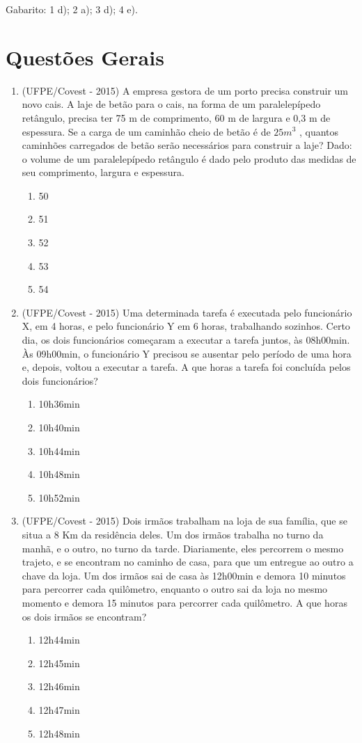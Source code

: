 Gabarito: 1 d); 2 a); 3 d); 4 e).

\section{Questões Gerais}

\begin{enumerate}
 \item (UFPE/Covest - 2015) A empresa gestora de um porto precisa construir um novo cais. A laje de betão para o cais, na forma de um paralelepípedo retângulo, precisa ter 75 m de comprimento, 60 m de largura e 0,3 m de espessura. Se a carga de um caminhão cheio de betão é de $25 m^3$ , quantos caminhões carregados de betão serão necessários para construir a laje? Dado: o volume de um paralelepípedo retângulo é dado pelo produto das medidas de seu comprimento, largura e espessura.
 \begin{enumerate}
 \item 50
 \item 51
 \item 52
 \item 53
 \item 54
\end{enumerate}

 \item (UFPE/Covest - 2015) Uma determinada tarefa é executada pelo funcionário X, em 4 horas, e pelo funcionário Y em 6 horas, trabalhando sozinhos. Certo dia, os dois funcionários começaram a executar a tarefa juntos, às 08h00min. Às 09h00min, o funcionário Y precisou se ausentar pelo período de uma hora e, depois, voltou a executar a tarefa. A que horas a tarefa foi concluída pelos dois funcionários?
 \begin{enumerate}
 \item 10h36min
 \item 10h40min
 \item 10h44min
 \item 10h48min
 \item 10h52min
\end{enumerate}

 \item (UFPE/Covest - 2015) Dois irmãos trabalham na loja de sua família, que se situa a 8 Km da residência deles. Um dos irmãos trabalha no turno da manhã, e o outro, no turno da tarde. Diariamente, eles percorrem o mesmo trajeto, e se encontram no caminho de casa, para que um entregue ao outro a chave da loja. Um dos irmãos sai de casa às 12h00min e demora 10 minutos para percorrer cada quilômetro, enquanto o outro sai da loja no mesmo momento e demora 15 minutos para percorrer cada quilômetro. A que horas os dois irmãos se encontram?
 \begin{enumerate}
 \item 12h44min
 \item 12h45min
 \item 12h46min
 \item 12h47min
 \item 12h48min
\end{enumerate}


\end{enumerate}
